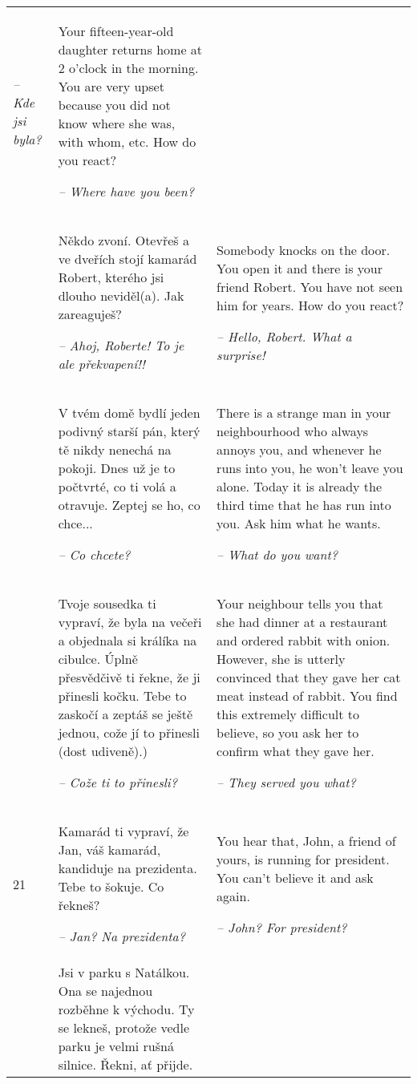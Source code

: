 \begin{xltabular}{\textwidth}{lQQ}
\textit{-- Kde jsi byla?} & Your fifteen-year-old daughter returns home at 2 o’clock in the morning. You are very upset because you did not know where she was, with whom, etc. How do you react?

{\itshape -- Where have you been?}\\
 & Někdo zvoní. Otevřeš a ve dveřích stojí kamarád Robert, kterého jsi dlouho neviděl(a). Jak zareaguješ?

{\itshape -- Ahoj, Roberte! To je ale překvapení!!} & Somebody knocks on the door. You open it and there is your friend Robert. You have not seen him for years. How do you react?

{\itshape -- Hello, Robert. What a surprise!}\\
 & V tvém domě bydlí jeden podivný starší pán, který tě nikdy nenechá na pokoji. Dnes už je to počtvrté, co ti volá a otravuje. Zeptej se ho, co chce...

\textit{-- Co chcete?} & There is a strange man in your neighbourhood who always annoys you, and whenever he runs into you, he won’t leave you alone. Today it is already the third time that he has run into you. Ask him what he wants.

{\itshape -- What do you want?}\\
 & Tvoje sousedka ti vypraví, že byla na večeři a objednala si králíka na cibulce. Úplně přesvědčivě ti řekne, že ji přinesli kočku. Tebe to zaskočí a zeptáš se ještě jednou, cože jí to přinesli (dost udiveně).)

\textit{-- Cože ti to přinesli?} & Your neighbour tells you that she had dinner at a restaurant and ordered rabbit with onion. However, she is utterly convinced that they gave her cat meat instead of rabbit. You find this extremely difficult to believe, so you ask her to confirm what they gave her.

{\itshape -- They served you what?}\\
21 & Kamarád ti vypraví, že Jan, váš kamarád, kandiduje na prezidenta. Tebe to šokuje. Co řekneš?

\textit{-- Jan? Na prezidenta?} & You hear that, John, a friend of yours, is running for president. You can’t believe it and ask again.

{\itshape -- John? For president?}\\
 & Jsi v parku s Natálkou. Ona se najednou rozběhne k východu. Ty se lekneš, protože vedle parku je velmi rušná silnice. Řekni, ať přijde.


\end{xltabular}
